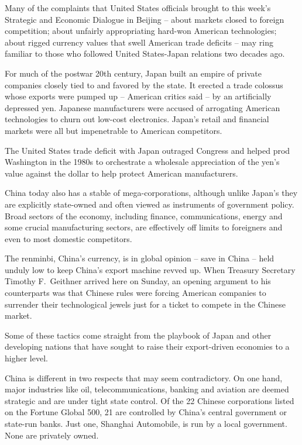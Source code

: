 ﻿\documentclass[12pt]{article}
\begin{document}
Many of the complaints that United States officials brought to this week's Strategic and Economic
Dialogue in Beijing -- about markets closed to foreign competition; about unfairly appropriating
hard-won American technologies; about rigged currency values that swell American trade deficits --
may ring familiar to those who followed United States-Japan relations two decades ago.

For much of the postwar 20th century, Japan built an empire of private companies closely tied to and
favored by the state. It erected a trade colossus whose exports were pumped up -- American critics
said -- by an artificially depressed yen. Japanese manufacturers were accused of arrogating American
technologies to churn out low-cost electronics. Japan's retail and financial markets were all but
impenetrable to American competitors.

The United States trade deficit with Japan outraged Congress and helped prod Washington in the 1980s
to orchestrate a wholesale appreciation of the yen's value against the dollar to help protect
American manufacturers.

China today also has a stable of mega-corporations, although unlike Japan's they are explicitly
state-owned and often viewed as instruments of government policy. Broad sectors of the economy,
including finance, communications, energy and some crucial manufacturing sectors, are effectively
off limits to foreigners and even to most domestic competitors.

The renminbi, China's currency, is in global opinion -- save in China -- held unduly low to keep
China's export machine revved up. When Treasury Secretary Timothy F.~Geithner arrived here on
Sunday, an opening argument to his counterparts was that Chinese rules were forcing American
companies to surrender their technological jewels just for a ticket to compete in the Chinese
market.

Some of these tactics come straight from the playbook of Japan and other developing nations that
have sought to raise their export-driven economies to a higher level.

China is different in two respects that may seem contradictory. On one hand, major industries like
oil, telecommunications, banking and aviation are deemed strategic and are under tight state
control. Of the 22 Chinese corporations listed on the Fortune Global 500, 21 are controlled by
China's central government or state-run banks. Just one, Shanghai Automobile, is run by a local
government. None are privately owned.
\end{document}
